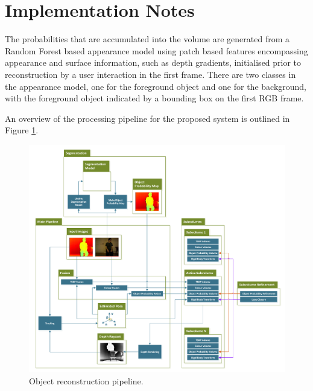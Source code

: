 \section{Implementation Notes}
The probabilities that are accumulated into the volume are generated from a Random Forest based appearance model using patch based features encompassing 
appearance and surface information, such as depth gradients, initialised prior to reconstruction by a user interaction in the first frame. There are two 
classes in the appearance model, one for the foreground object and one for the background, with the foreground object indicated by a bounding box on the 
first RGB frame.

An overview of the processing pipeline for the proposed system is outlined in Figure \ref{pipelineDiagram}.
\begin{figure}[!t]
	\centering
	\includegraphics[scale=0.5]{pipeline.pdf}
	\caption{Object reconstruction pipeline.}
	\label{pipelineDiagram}
\end{figure}
